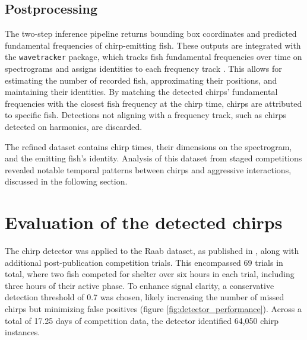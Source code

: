 \newpage
\subsection{Postprocessing}

The two-step inference pipeline returns bounding box coordinates and predicted
fundamental frequencies of chirp-emitting fish. These outputs are integrated
with the \texttt{wavetracker} package, which tracks fish fundamental
frequencies over time on spectrograms and assigns identities to each frequency
track \parencite{raabAdvancesNoninvasiveTracking2022}. This allows
for estimating the number of recorded fish, approximating their positions, and
maintaining their identities. By matching the detected chirps' fundamental
frequencies with the closest fish frequency at the chirp time, chirps are
attributed to specific fish. Detections not aligning with a frequency track,
such as chirps detected on harmonics, are discarded.

The refined dataset contains chirp times, their dimensions on the spectrogram,
and the emitting fish's identity. Analysis of this dataset from staged
competitions revealed notable temporal patterns between chirps and aggressive
interactions, discussed in the following section.

\section{Evaluation of the detected chirps}

The chirp detector was applied to the Raab dataset, as published in
\textcite{raabElectrocommunicationSignalsIndicate2021}, along with additional
post-publication competition trials. This encompassed 69 trials in total, where
two fish competed for shelter over six hours in each trial, including three
hours of their active phase. To enhance signal clarity, a conservative
detection threshold of 0.7 was chosen, likely increasing the number of missed
chirps but minimizing false positives (figure \ref{fig:detector_performance}).
Across a total of 17.25 days of competition data, the detector identified
64,050 chirp instances.

